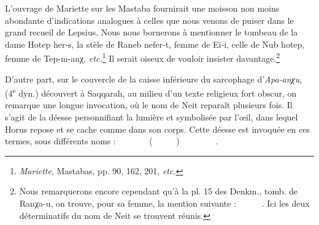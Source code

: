 \documentclass[a4paper, 11pt, oneside]{article}
\newcommand*\hieroglyhicsAAAH{}
\newcommand*\hieroglyhicsAAAO{}
\newcommand*\hieroglyhicsAAAQ{}
\newcommand*\hieroglyhicsAAAX{}
\newcommand*\hieroglyhicsAABF{}
\newcommand*\hieroglyhicsAACB{\raisebox{0.5ex}{}}
\newcommand*\hieroglyhicsAACL{\raisebox{0.5ex}{}}
\newcommand*\hieroglyhicsAACM{}
\newcommand*\hieroglyhicsAACP{}
\newcommand*\hieroglyhicsAADF{}
\newcommand*\hieroglyhicsAAEB{}
\newcommand*\hieroglyhicsAAEK{}
\newcommand*\hieroglyhicsAAEZ{}
\newcommand*\hieroglyhicsAAHC{}
\newcommand*\hieroglyhicsAAIK{}
\newcommand*\hieroglyhicsAAIS{}
\newcommand*\hieroglyhicsAAJN{}
\newcommand*\hieroglyhicsAALA{}
\newcommand*\hieroglyhicsAALU{\raisebox{0.5ex}{}}
\newcommand*\hieroglyhicsAALX{\raisebox{0.5ex}{}}
\newcommand*\hieroglyhicsAAOL{}
\newcommand*\hieroglyhicsAAQC{}
\newcommand*\hieroglyhicsAARM{}
\newcommand*\hieroglyhicsAARN{}
\newcommand*\hieroglyhicsAARO{}
\newcommand*\hieroglyhicsAARR{}
\newcommand*\hieroglyhicsAARS{}
\newcommand*\hieroglyhicsAART{}
\newcommand*\hieroglyhicsAARU{}
\newcommand*\hieroglyhicsAARV{}
\newcommand*\hieroglyhicsAARW{}
\newcommand*\hieroglyhicsAARX{}
\newcommand*\hieroglyhicsAARY{}
\newcommand*\hieroglyhicsAARZ{}
\newcommand*\hieroglyhicsAASA{}
\newcommand*\hieroglyhicsAASB{}
\newcommand*\hieroglyhicsAASC{}
\begin{document}
L'ouvrage de Mariette sur les Mastaba fournirait une moisson non moins abondante d'indications analogues à celles que nous venons de puiser dans le grand recueil de Lepsius. Nous nous bornerons à mentionner le tombeau de la dame Hotep her-s, la stèle de Raneb nefer-t, femme de Ei-i, celle de Nub hotep, femme de Tep-m-anχ, \emph{etc.}\footnote{\emph{Mariette}, Mastabas, pp. 90, 162, 201, \emph{etc.}} Il serait oiseux de vouloir insister davantage.\footnote{Nous remarquerons encore cependant qu'à la pl. 15 des Denkm., tomb. de Ranχa-u, on trouve, pour sa femme, la mention suivante : $\hieroglyhicsAAAX\:\hieroglyhicsAARO\:\hieroglyhicsAARM\allowbreak\:\hieroglyhicsAAEK\:\hieroglyhicsAAHC\:\hieroglyhicsAAAQ\allowbreak\:\hieroglyhicsAABF\:\hieroglyhicsAAAO\:\hieroglyhicsAAEK\allowbreak\:\hieroglyhicsAAHC\:\hieroglyhicsAARR\allowbreak\:\hieroglyhicsAARS\:\hieroglyhicsAARR$. Ici les deux déterminatifs du nom de Neit se trouvent réunis.}

D'autre part, sur le couvercle de la caisse inférieure du sarcophage d'\emph{Apa-anχu}, (4\textsuperscript{e} dyn.) découvert à Saqqarah, au milieu d'un texte religieux fort obscur, on remarque une longue invocation, où le nom de Neit reparaît plusieurs fois. Il s'agit de la déesse personnifiant la lumière et symbolisée par l'œil, dans lequel Horus repose et se cache comme dans son corps. Cette déesse est invoquée en ces termes, sous différents noms : $\hieroglyhicsAALU\:\hieroglyhicsAAAH\:\hieroglyhicsAADF\allowbreak\:\hieroglyhicsAAAQ\:\hieroglyhicsAAQC\:\hieroglyhicsAALU\allowbreak\:\hieroglyhicsAAAH\:\hieroglyhicsAADF\:\hieroglyhicsAAAH\allowbreak\:\hieroglyhicsAART\:\hieroglyhicsAACL\:\hieroglyhicsAARN\allowbreak\:\hieroglyhicsAALU\:\hieroglyhicsAAAH\:\hieroglyhicsAADF$ ($\hieroglyhicsAAJN\:\hieroglyhicsAACB\:\hieroglyhicsAALA\allowbreak\:\hieroglyhicsAALU\:\hieroglyhicsAAAH\:\hieroglyhicsAADF\allowbreak\:\hieroglyhicsAARU\:\hieroglyhicsAAEZ\:\hieroglyhicsAARV\allowbreak\:\hieroglyhicsAALA\:\hieroglyhicsAALU\allowbreak\:\hieroglyhicsAAAH\:\hieroglyhicsAADF$) $\hieroglyhicsAARW\:\hieroglyhicsAACB\:\hieroglyhicsAARN\allowbreak\:\hieroglyhicsAAIK\:\hieroglyhicsAALX\:\hieroglyhicsAARX\allowbreak\:\hieroglyhicsAARY\:\hieroglyhicsAAAQ\:\hieroglyhicsAAAH\allowbreak\:\hieroglyhicsAACP\:\hieroglyhicsAARZ\:\hieroglyhicsAACM\allowbreak\:\hieroglyhicsAAEB\:\hieroglyhicsAAOL\:\hieroglyhicsAAIS\allowbreak\:\hieroglyhicsAASA\:\hieroglyhicsAASB\:\hieroglyhicsAASC\hieroglyhicsAASC\hieroglyhicsAASC\hieroglyhicsAASC\hieroglyhicsAASC\hieroglyhicsAASC\hieroglyhicsAASC\hieroglyhicsAASC\hieroglyhicsAASC\hieroglyhicsAASC\hieroglyhicsAASC$.
\end{document}
